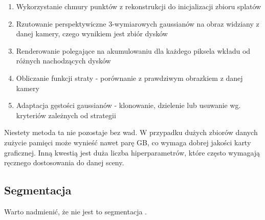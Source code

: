 \begin{enumerate}
    \item Wykorzystanie chmury punktów z rekonstrukcji do inicjalizacji zbioru splatów
    \item Rzutowanie perspektywiczne 3-wymiarowych gaussianów na obraz widziany z danej kamery, czego wynikiem jest zbiór dysków
    \item Renderowanie polegające na akumulowaniu dla każdego piksela wkładu od różnych nachodzących dysków 
    \item Obliczanie funkcji straty - porównanie z prawdziwym obrazkiem z danej kamery
    \item Adaptacja gęstości gaussianów - klonowanie, dzielenie lub usuwanie wg. kryteriów zależnych od strategii
\end{enumerate}

Niestety metoda ta nie pozostaje bez wad. W przypadku dużych zbiorów danych zużycie pamięci może wynieść nawet parę GB, co wymaga dobrej jakości karty graficznej. Inną kwestią jest duża liczba hiperparametrów, które często wymagają ręcznego dostosowania do danej sceny. 

\subsection{Segmentacja}
Warto nadmienić, że nie jest to segmentacja \cite{pointnet}.